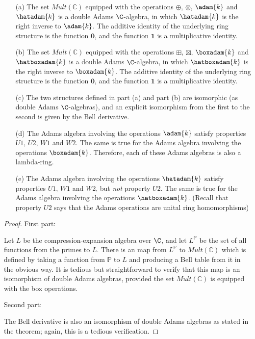 \documentclass[a4paper]{article}
\begin{document}
\begin{theorem}
\begin{itemize}
\item[(a)] The set $Mult(\mathbb{C})$ equipped with the operations $\oplus$, $\otimes$, $\adam{k}$ and $\hatadam{k}$ is a double Adams $\C$-algebra, in which $\hatadam{k}$ is the right inverse to $\adam{k}$. The additive identity of the underlying ring structure is the function $\mathbf{0}$, and the function $\mathbf{1}$ is a multiplicative identity. 
\item[(b)] The set $Mult(\mathbb{C})$ equipped with the operations $\boxplus$, $\boxtimes$, $\boxadam{k}$ and $\hatboxadam{k}$ is a double Adams $\C$-algebra, in which $\hatboxadam{k}$ is the right inverse to $\boxadam{k}$. The additive identity of the underlying ring structure is the function $\mathbf{0}$, and the function $\mathbf{1}$ is a multiplicative identity. 
\item[(c)] The two structures defined in part (a) and part (b) are isomorphic (as double Adams $\C$-algebras), and an explicit isomorphism from the first to the second is given by the Bell derivative. 
\item[(d)] The Adams algebra involving the operations $\adam{k}$ satisfy properties $U1$, $U2$, $W1$ and $W2$. The same is true for the Adams algebra involving the operations $\boxadam{k}$. Therefore, each of these Adams algebras is also a lambda-ring.
\item[(e)] The Adams algebra involving the operations $\hatadam{k}$ satisfy properties $U1$, $W1$ and $W2$, but \emph{not} property $U2$. The same is true for the Adams algebra involving the operations $\hatboxadam{k}$. (Recall that property $U2$ says that the Adams operations are unital ring homomorphisms)
\end{itemize}
\end{theorem}
\begin{proof}
First part:

Let $L$ be the compression-expansion algebra over $\C$, and let $L^{\mathbb{P}}$ be the set of all functions from the primes to $L$. There is an map from $L^{\mathbb{P}}$ to $Mult(\mathbb{C})$ which is defined by taking a function from $\mathbb{P}$ to $L$ and producing a Bell table from it in the obvious way. It is tedious but straightforward to verify that this map is an isomorphism of double Adams algebras, provided the set $Mult(\mathbb{C})$ is equipped with the box operations. 

Second part:

The Bell derivative is also an isomorphism of double Adams algebras as stated in the theorem; again, this is a tedious verification. 


\end{proof}
\end{document}
